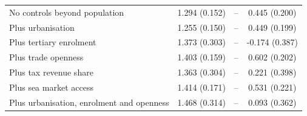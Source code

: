 \begin{tabular}{lccc}
No controls beyond population & 1.294\sym{***} (0.152) & -- & 0.445\sym{**} (0.200) \\
Plus urbanisation & 1.255\sym{***} (0.150) & -- & 0.449\sym{**} (0.199) \\
Plus tertiary enrolment & 1.373\sym{***} (0.303) & -- & -0.174 (0.387) \\
Plus trade openness & 1.403\sym{***} (0.159) & -- & 0.602\sym{***} (0.202) \\
Plus tax revenue share & 1.363\sym{***} (0.304) & -- & 0.221 (0.398) \\
Plus sea market access & 1.414\sym{***} (0.171) & -- & 0.531\sym{**} (0.221) \\
Plus urbanisation, enrolment and openness & 1.468\sym{***} (0.314) & -- & 0.093 (0.362) \\
\bottomrule
\end{tabular}